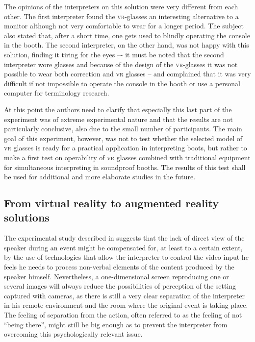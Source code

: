 \documentclass[output=paper]{langsci/langscibook}
\begin{document}
The opinions of the interpreters on this solution were very different from each other. The first interpreter found the \textsc{vr}-glasses an interesting alternative to a monitor although not very comfortable to wear for a longer period. The subject also stated that, after a short time, one gets used to blindly operating the console in the booth. The second interpreter, on the other hand, was not happy with this solution, finding it tiring for the eyes –- it must be noted that the second interpreter wore glasses and because of the design of the \textsc{vr}-glasses it was not possible to wear both correction and \textsc{vr} glasses -- and complained that it was very difficult if not impossible to operate the console in the booth or use a personal computer for terminology research.

At this point the authors need to clarify that especially this last part of the experiment was of extreme experimental nature and that the results are not particularly conclusive, also due to the small number of participants. The main goal of this experiment, however, was not to test whether the selected model of \textsc{vr} glasses is ready for a practical application in interpreting boots, but rather to make a first test on operability of \textsc{vr} glasses combined with traditional equipment for simultaneous interpreting in soundproof booths. The results of this test shall be used for additional and more elaborate studies in the future.

\subsection{From virtual reality to augmented reality solutions}

The experimental study described in  suggests that the lack of direct view of the speaker during an event might be compensated for, at least to a certain extent, by the use of technologies that allow the interpreter to control the video input he feels he needs to process non-verbal elements of the content produced by the speaker himself. Nevertheless, a one-dimensional screen reproducing one or several images will always reduce the possibilities of perception of the setting captured with cameras, as there is still a very clear separation of the interpreter in his remote environment and the room where the original event is taking place. The feeling of separation from the action, often referred to as the feeling of not “being there”, might still be big enough as to prevent the interpreter from overcoming this psychologically relevant issue. 
\end{document}
